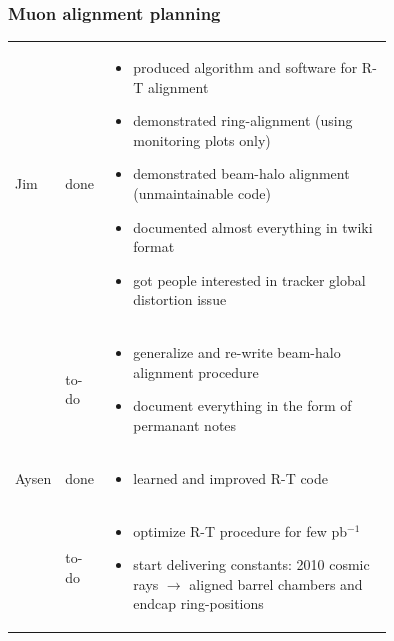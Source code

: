 \documentclass[compress]{beamer}
\begin{document}

\small

\begin{frame}
\frametitle{Muon alignment planning}
\scriptsize
\vspace{0.5 cm}
\begin{tabular}{l l p{0.75\linewidth}}
Jim & done & \vspace{-1.5\baselineskip}\begin{itemize}
\item produced algorithm and software for R-T alignment
\item demonstrated ring-alignment (using monitoring plots only)
\item demonstrated beam-halo alignment (unmaintainable code)
\item documented almost everything in twiki format
\item got people interested in tracker global distortion issue
\end{itemize} \\
& to-do & \vspace{-1.5\baselineskip}\begin{itemize}
\item generalize and re-write beam-halo alignment procedure
\item document everything in the form of permanant notes
\end{itemize} \\

Aysen & done & \vspace{-1.5\baselineskip}\begin{itemize}
\item learned and improved R-T code
\end{itemize} \\
& to-do & \vspace{-1.5\baselineskip}\begin{itemize}
\item optimize R-T procedure for few pb$^{-1}$
\item start delivering constants: 2010 cosmic rays $\to$
  aligned barrel chambers and endcap ring-positions
\end{itemize} \\


\end{tabular}
\end{frame}
\end{document}
